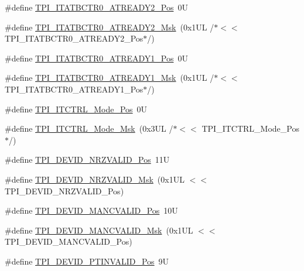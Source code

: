 \begin{DoxyCompactItemize}
\item 
\#define \hyperlink{group___c_m_s_i_s___t_p_i_ga3f0249dfcfd58090c08fd4a0adea6b22}{T\+P\+I\+\_\+\+I\+T\+A\+T\+B\+C\+T\+R0\+\_\+\+A\+T\+R\+E\+A\+D\+Y2\+\_\+\+Pos}~0U
\item 
\#define \hyperlink{group___c_m_s_i_s___t_p_i_gaf985067de6e6e68fbbd2350646b9125e}{T\+P\+I\+\_\+\+I\+T\+A\+T\+B\+C\+T\+R0\+\_\+\+A\+T\+R\+E\+A\+D\+Y2\+\_\+\+Msk}~(0x1\+U\+L /$\ast$$<$$<$ T\+P\+I\+\_\+\+I\+T\+A\+T\+B\+C\+T\+R0\+\_\+\+A\+T\+R\+E\+A\+D\+Y2\+\_\+\+Pos$\ast$/)
\item 
\#define \hyperlink{group___c_m_s_i_s___t_p_i_gaded82241155665db59493d912d44c65c}{T\+P\+I\+\_\+\+I\+T\+A\+T\+B\+C\+T\+R0\+\_\+\+A\+T\+R\+E\+A\+D\+Y1\+\_\+\+Pos}~0U
\item 
\#define \hyperlink{group___c_m_s_i_s___t_p_i_ga21e1f9c5532e75ee2edc8eb4cf69b1f0}{T\+P\+I\+\_\+\+I\+T\+A\+T\+B\+C\+T\+R0\+\_\+\+A\+T\+R\+E\+A\+D\+Y1\+\_\+\+Msk}~(0x1\+U\+L /$\ast$$<$$<$ T\+P\+I\+\_\+\+I\+T\+A\+T\+B\+C\+T\+R0\+\_\+\+A\+T\+R\+E\+A\+D\+Y1\+\_\+\+Pos$\ast$/)
\item 
\#define \hyperlink{group___c_m_s_i_s___t_p_i_gaa847adb71a1bc811d2e3190528f495f0}{T\+P\+I\+\_\+\+I\+T\+C\+T\+R\+L\+\_\+\+Mode\+\_\+\+Pos}~0U
\item 
\#define \hyperlink{group___c_m_s_i_s___t_p_i_gad6f87550b468ad0920d5f405bfd3f017}{T\+P\+I\+\_\+\+I\+T\+C\+T\+R\+L\+\_\+\+Mode\+\_\+\+Msk}~(0x3\+U\+L /$\ast$$<$$<$ T\+P\+I\+\_\+\+I\+T\+C\+T\+R\+L\+\_\+\+Mode\+\_\+\+Pos$\ast$/)
\item 
\#define \hyperlink{group___c_m_s_i_s___t_p_i_ga9f46cf1a1708575f56d6b827766277f4}{T\+P\+I\+\_\+\+D\+E\+V\+I\+D\+\_\+\+N\+R\+Z\+V\+A\+L\+I\+D\+\_\+\+Pos}~11U
\item 
\#define \hyperlink{group___c_m_s_i_s___t_p_i_gacecc8710a8f6a23a7d1d4f5674daf02a}{T\+P\+I\+\_\+\+D\+E\+V\+I\+D\+\_\+\+N\+R\+Z\+V\+A\+L\+I\+D\+\_\+\+Msk}~(0x1\+U\+L $<$$<$ T\+P\+I\+\_\+\+D\+E\+V\+I\+D\+\_\+\+N\+R\+Z\+V\+A\+L\+I\+D\+\_\+\+Pos)
\item 
\#define \hyperlink{group___c_m_s_i_s___t_p_i_ga675534579d9e25477bb38970e3ef973c}{T\+P\+I\+\_\+\+D\+E\+V\+I\+D\+\_\+\+M\+A\+N\+C\+V\+A\+L\+I\+D\+\_\+\+Pos}~10U
\item 
\#define \hyperlink{group___c_m_s_i_s___t_p_i_ga4c3ee4b1a34ad1960a6b2d6e7e0ff942}{T\+P\+I\+\_\+\+D\+E\+V\+I\+D\+\_\+\+M\+A\+N\+C\+V\+A\+L\+I\+D\+\_\+\+Msk}~(0x1\+U\+L $<$$<$ T\+P\+I\+\_\+\+D\+E\+V\+I\+D\+\_\+\+M\+A\+N\+C\+V\+A\+L\+I\+D\+\_\+\+Pos)
\item 
\#define \hyperlink{group___c_m_s_i_s___t_p_i_ga974cccf4c958b4a45cb71c7b5de39b7b}{T\+P\+I\+\_\+\+D\+E\+V\+I\+D\+\_\+\+P\+T\+I\+N\+V\+A\+L\+I\+D\+\_\+\+Pos}~9U

\end{DoxyCompactItemize}

